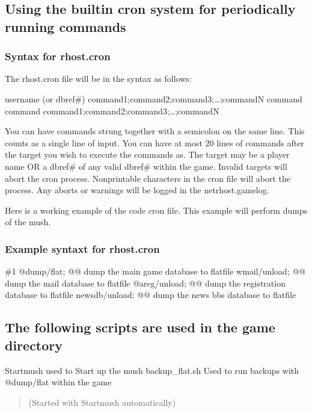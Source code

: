 \documentclass[letterpaper,10pt,english]{sphinxmanual}
\begin{document}
\subsection{Using the built\sphinxhyphen{}in cron system for periodically running commands}
\label{\detokenize{maintenance:using-the-built-in-cron-system-for-periodically-running-commands}}

\subsubsection{Syntax for rhost.cron}
\label{\detokenize{maintenance:syntax-for-rhost-cron}}
\sphinxAtStartPar
The rhost.cron file will be in the syntax as follows:

\sphinxAtStartPar
username (or dbref\#)
command1;command2;command3;…;commandN
command
command
command1;command2;command3;…;commandN

\sphinxAtStartPar
You can have commands strung together with a semicolon
on the same line.  This counts as a single line of input.
You can have at most 20 lines of commands after the target
you wish to execute the commands as.  The target may
be a player name OR a dbref\# of any valid dbref\# within
the game.  Invalid targets will abort the cron process.
Non\sphinxhyphen{}printable characters in the cron file will abort
the process.  Any aborts or warnings will be logged
in the netrhost.gamelog.

\sphinxAtStartPar
Here is a working example of the code cron file.
This example will perform dumps of the mush.


\subsubsection{Example syntaxt for rhost.cron}
\label{\detokenize{maintenance:example-syntaxt-for-rhost-cron}}
\sphinxAtStartPar
\#1
@dump/flat; @@ dump the main game database to flatfile
wmail/unload; @@ dump the mail database to flatfile
@areg/unload; @@ dump the registration database to flatfile
newsdb/unload; @@ dump the news bbs database to flatfile


\subsection{The following scripts are used in the game directory}
\label{\detokenize{maintenance:the-following-scripts-are-used-in-the-game-directory}}
\sphinxAtStartPar
Startmush               \textendash{} used to Start up the mush
backup\_flat.sh          \textendash{} Used to run backups with @dump/flat within the game
\begin{quote}

\sphinxAtStartPar
(Started with Startmush automatically)
\end{quote}
\end{document}
